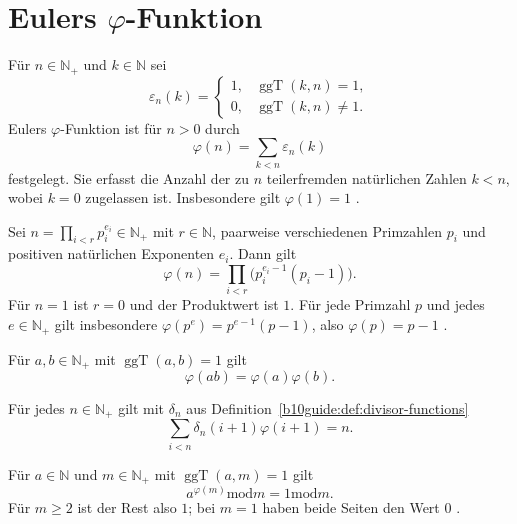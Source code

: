\section{Eulers \texorpdfstring{$\varphi$}{phi}-Funktion}

\begin{definition}
\label{b10guide:def:totient}
Für $n\in\mathbb N_+$ und $k\in\mathbb N$ sei
\[
 \varepsilon_n(k)=
 \begin{cases}
  1,&\operatorname{ggT}(k,n)=1,\\
  0,&\operatorname{ggT}(k,n)\ne1.
 \end{cases}
\]
Eulers $\varphi$-Funktion ist für $n>0$ durch
\[
 \varphi(n)=\sum_{k<n}\varepsilon_n(k)
\]
festgelegt. Sie erfasst die Anzahl der zu $n$ teilerfremden
natürlichen Zahlen $k<n$, wobei $k=0$ zugelassen ist.
Insbesondere gilt $\varphi(1)=1$ \cite{nattotient}.
\end{definition}

\begin{theorem}
\label{b10guide:thm:totient-product-formula}
Sei $n=\prod_{i<r}p_i^{e_i}\in\mathbb N_+$ mit $r\in\mathbb N$,
paarweise verschiedenen Primzahlen $p_i$ und positiven natürlichen
Exponenten $e_i$. Dann gilt
\[
 \varphi(n)=\prod_{i<r}\bigl(p_i^{e_i-1}(p_i-1)\bigr).
\]
Für $n=1$ ist $r=0$ und der Produktwert ist $1$.
Für jede Primzahl $p$ und jedes $e\in\mathbb N_+$ gilt insbesondere
$\varphi(p^e)=p^{e-1}(p-1)$, also $\varphi(p)=p-1$
\cite{nattotient}.
\end{theorem}

\begin{theorem}
\label{b10guide:thm:totient-coprime-product}
Für $a,b\in\mathbb N_+$ mit $\operatorname{ggT}(a,b)=1$ gilt
\cite{nattotient}
\[
 \varphi(ab)=\varphi(a)\varphi(b).
\]
\end{theorem}

\begin{theorem}
\label{b10guide:thm:totient-divisor-sum}
Für jedes $n\in\mathbb N_+$ gilt mit
$\delta_n$ aus Definition~\ref{b10guide:def:divisor-functions} \cite{nattotient}
\[
 \sum_{i<n}\delta_n(i+1)\varphi(i+1)=n.
\]
\end{theorem}

\begin{theorem}
\label{b10guide:thm:euler-totient}
Für $a\in\mathbb N$ und $m\in\mathbb N_+$ mit
$\operatorname{ggT}(a,m)=1$ gilt
\[
 a^{\varphi(m)}\mathbin{\mathrm{mod}}m
   =1\mathbin{\mathrm{mod}}m.
\]
Für $m\ge2$ ist der Rest also $1$; bei $m=1$ haben beide Seiten
den Wert $0$ \cite{natfermat}.
\end{theorem}


